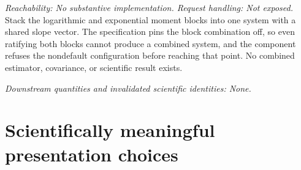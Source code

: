\documentclass[11pt]{article}
\begin{document}
\begin{description}[style=nextline]
\item[Combined moment blocks.]
\emph{Reachability: No substantive implementation. Request handling: Not exposed.}
Stack the logarithmic and exponential moment blocks into one system with a shared slope vector. The
specification pins the block combination off, so even ratifying both blocks cannot produce a
combined system, and the component refuses the nondefault configuration before reaching that point.
No combined estimator, covariance, or scientific result exists.

\emph{Downstream quantities and invalidated scientific identities: None.}
\end{description}

\section{Scientifically meaningful presentation choices}
\end{document}
